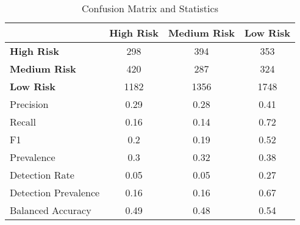 \begin{table}[!htbp]
    \small
    \centering
    \caption{Confusion Matrix and Statistics}
    \label{tab:confusion}
    \begin{tabular}{lccc}
        \toprule
        & \textbf{High Risk} & \textbf{Medium Risk} & \textbf{Low Risk} \\
        \midrule
        \textbf{High Risk} & 298 & 394 & 353 \\
        \textbf{Medium Risk} & 420 & 287 & 324 \\
        \textbf{Low Risk} & 1182 & 1356 & 1748 \\
        \bottomrule
        \midrule
        Precision & 0.29 & 0.28 & 0.41 \\
        Recall & 0.16 & 0.14 & 0.72 \\
        F1 & 0.2 & 0.19 & 0.52 \\
        Prevalence & 0.3 & 0.32 & 0.38 \\
        Detection Rate & 0.05 & 0.05 & 0.27 \\
        Detection Prevalence & 0.16 & 0.16 & 0.67 \\
        Balanced Accuracy & 0.49 & 0.48 & 0.54 \\
        \bottomrule
    \end{tabular}
\end{table}